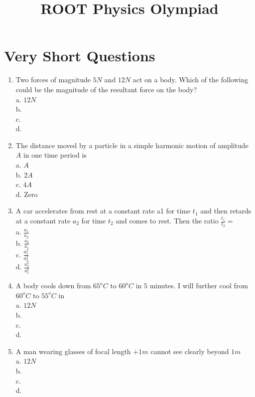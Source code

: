 \documentclass{article}
\begin{document}
\title{ROOT Physics Olympiad}
\author{}
\date{}
\maketitle

\section*{\textbf{Very Short Questions}}

\begin{enumerate}
    \item Two forces of magnitude $5N$ and $12N$ act on a body. Which of the following could be the magnitude of the resultant force on the body?\\
    a. $12N$\\
    b. \\
    c. \\
    d. 
    
    \item The distance moved by a particle in a simple harmonic motion of amplitude $A$ in one time period is\\
    a. $A$\\
    b. $2A$\\
    c. $4A$\\
    d. Zero
    
    \item A car accelerates from rest at a constant rate a1 for time $t_1$ and then retards at a constant rate $a_2$ for time $t_2$ and comes to rest. Then the ratio $\displaystyle{\frac{t_1}{t_2}=}$ \\
    a. $\displaystyle{\frac{a_1}{a_2}}$\\
    b. $\displaystyle{\frac{a_2}{a_1}}$\\
    c. $\displaystyle{\frac{a_1^2}{a_2^2}}$ \\
    d. $\displaystyle{\frac{a_2^2}{a_1^2}}$
    
    \item A body cools down from $65^o C$ to $60^o C$ in $5$ minutes. I will further cool from $60^o C$ to $55^o C$ in\\
    a. $12N$\\
    b. \\
    c. \\
    d. 
    
    \item A man wearing glasses of focal length $+1m$ cannot see clearly beyond $1m$\\
    a. $12N$\\
    b. \\
    c. \\
    d. 
    

\end{enumerate}
\end{document}
